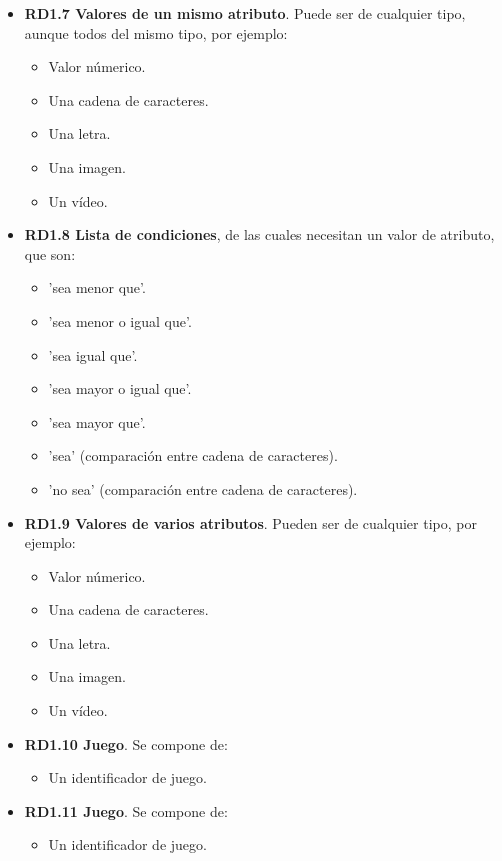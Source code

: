 \begin{itemize}
	\item \textbf{RD1.7 Valores de un mismo atributo}. Puede ser de cualquier tipo, aunque todos del mismo tipo, por ejemplo:
	\begin{itemize}
		\item Valor númerico.
		\item Una cadena de caracteres.
		\item Una letra.
		\item Una imagen.
		\item Un vídeo.
	\end{itemize}
	
	\item \textbf{RD1.8 Lista de condiciones}, de las cuales necesitan un valor de atributo, que son:
	\begin{itemize}
		\item 'sea menor que'.
		\item 'sea menor o igual que'.
		\item 'sea igual que'.
		\item 'sea mayor o igual que'.
		\item 'sea mayor que'.
		\item 'sea' (comparación entre cadena de caracteres).
		\item 'no sea' (comparación entre cadena de caracteres).
	\end{itemize}
	
	\item \textbf{RD1.9 Valores de varios atributos}. Pueden ser de cualquier tipo, por ejemplo:
	\begin{itemize}
		\item Valor númerico.
		\item Una cadena de caracteres.
		\item Una letra.
		\item Una imagen.
		\item Un vídeo.
	\end{itemize}
	
	\item \textbf{RD1.10 Juego}. Se compone de:
	\begin{itemize}
		\item Un identificador de juego.
	\end{itemize}
	
	\item \textbf{RD1.11 Juego}. Se compone de:
	\begin{itemize}
		\item Un identificador de juego.
	\end{itemize}
	

\end{itemize}
